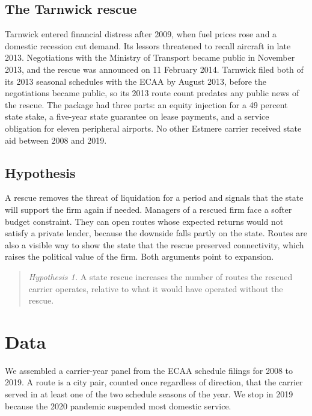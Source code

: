 \documentclass[12pt]{article}
\begin{document}
\subsection{The Tarnwick rescue}

Tarnwick entered financial distress after 2009, when fuel prices rose and a domestic recession cut demand. Its lessors threatened to recall aircraft in late 2013. Negotiations with the Ministry of Transport became public in November 2013, and the rescue was announced on 11 February 2014. Tarnwick filed both of its 2013 seasonal schedules with the ECAA by August 2013, before the negotiations became public, so its 2013 route count predates any public news of the rescue. The package had three parts: an equity injection for a 49 percent state stake, a five-year state guarantee on lease payments, and a service obligation for eleven peripheral airports. No other Estmere carrier received state aid between 2008 and 2019.

\subsection{Hypothesis}

A rescue removes the threat of liquidation for a period and signals that the state will support the firm again if needed. Managers of a rescued firm face a softer budget constraint. They can open routes whose expected returns would not satisfy a private lender, because the downside falls partly on the state. Routes are also a visible way to show the state that the rescue preserved connectivity, which raises the political value of the firm. Both arguments point to expansion.

\begin{quote}
\textit{Hypothesis 1.} A state rescue increases the number of routes the rescued carrier operates, relative to what it would have operated without the rescue.
\end{quote}

\section{Data}

We assembled a carrier-year panel from the ECAA schedule filings for 2008 to 2019. A route is a city pair, counted once regardless of direction, that the carrier served in at least one of the two schedule seasons of the year. We stop in 2019 because the 2020 pandemic suspended most domestic service.
\end{document}
